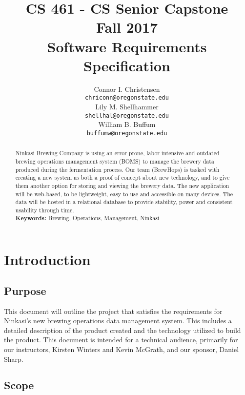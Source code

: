 \documentclass[draftclsnofoot,onecolumn,letterpaper,10pt,compsoc]{IEEEtran}
\title{CS 461 - CS Senior Capstone
	\\Fall 2017
	\\Software Requirements Specification
}
\author{
	Connor I. Christensen \\
	\texttt{chriconn@oregonstate.edu}
	\\
	Lily M. Shellhammer \\
	\texttt{shellhal@oregonstate.edu}
	\\
	William B. Buffum \\
	\texttt{buffumw@oregonstate.edu}
}
\begin{document}
\begin{titlingpage}
    \maketitle
    \begin{abstract}
			Ninkasi Brewing Company is using an error prone, labor intensive and outdated brewing operations management system (BOMS) to manage the brewery data produced during the fermentation process. Our team (BrewHops) is tasked with creating a new system as both a proof of concept about new technology, and to give them another option for storing and viewing the brewery data. The new application will be web-based, to be lightweight, easy to use and accessible on many devices. The data will be hosted in a relational database to provide stability, power and consistent usability through time.
			\\
			\textbf{Keywords:} Brewing, Operations, Management, Ninkasi
    \end{abstract}
		\pagebreak
		\tableofcontents
\end{titlingpage}

\section{Introduction}
	\subsection{Purpose}
	This document will outline the project that satisfies the requirements for Ninkasi’s new brewing operations data management system. This includes a detailed description of the product created and the technology utilized to build the product. This document is intended for a technical audience, primarily for our instructors, Kirsten Winters and Kevin McGrath, and our sponsor, Daniel Sharp.


	\subsection{Scope}
\end{document}
